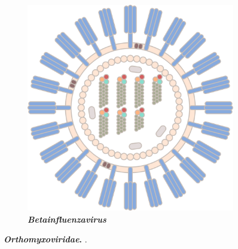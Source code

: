 \begin{figure}
\begin{adjustbox}{minipage=\dimexpr{}\fboxrule,fbox}
\begin{subfigure}[b]{0.475\textwidth}
            \includegraphics[width=\textwidth]{Extra_Graphics/Influenza_B.pdf}
            \caption[\textit{Betainfluenzavirus}]{\textbf{\textit{Betainfluenzavirus}}}
            \label{fig:1.0.1b}
        \end{subfigure}
    \end{adjustbox}
    \caption[\textit{Orthomyxoviridae}]{\textbf{\textit{Orthomyxoviridae}.} .}
    \label{fig:1.0.1}
\end{figure}

